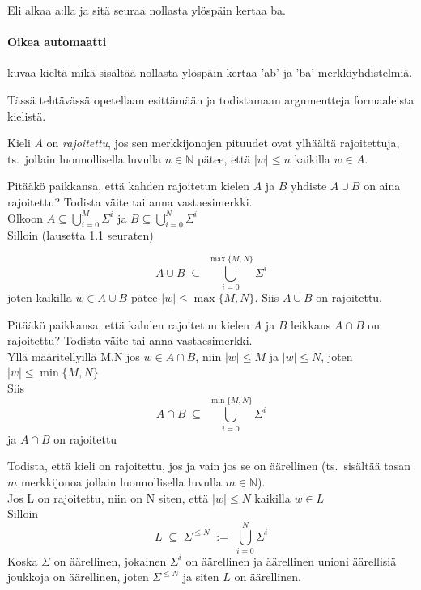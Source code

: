 \documentclass[12pt,a4paper]{article}
\newcommand{\abs}[1]{\lvert#1\rvert}
\newcommand{\N}{\mathbb{N}}
\begin{document}
Eli alkaa a:lla ja sitä seuraa nollasta ylöspäin kertaa ba.

\paragraph{Oikea automaatti} kuvaa kieltä mikä sisältää nollasta
ylöspäin kertaa 'ab' ja 'ba' merkkiyhdistelmiä.

\bigbreak



\pagebreak
{}
Tässä tehtävässä opetellaan esittämään ja todistamaan argumentteja formaaleista kielistä.

Kieli $A$ on {\em rajoitettu}, jos sen merkkijonojen pituudet ovat
ylhäältä rajoitettuja, ts.\ jollain luonnollisella luvulla
$n\in\N$ pätee, että $\abs{w}\leq n$ kaikilla $w\in A$.

\begin{kohta}
\item %
Pitääkö paikkansa, että kahden rajoitetun kielen $A$ ja $B$
yhdiste $A\cup B$ on aina rajoitettu? Todista väite tai anna vastaesimerkki.\\

Olkoon $A\subseteq \bigcup_{i=0}^{M}\Sigma^i$ ja $B\subseteq \bigcup_{i=0}^{N}\Sigma^i$\\

Silloin (lausetta 1.1 seuraten)

\[
A\cup B \;\subseteq\; \bigcup_{i=0}^{\max\{M,N\}} \Sigma^i
\]
joten kaikilla $w\in A\cup B$ pätee $|w|\le \max\{M,N\}$. Siis $A\cup B$ on rajoitettu.



\item %
Pitääkö paikkansa, että kahden rajoitetun kielen $A$ ja $B$ leikkaus $A\cap B$ on rajoitettu? Todista väite tai anna vastaesimerkki.\\

Yllä määritellyillä M,N jos $w\in A\cap B$, niin $|w|\le M$ ja $|w|\le N$, joten
$|w|\le \min\{M,N\}$\\

Siis
\[
A\cap B \;\subseteq\; \bigcup_{i=0}^{\min\{M,N\}} \Sigma^i
\]
ja $A\cap B$ on rajoitettu



\item %
Todista, että kieli on rajoitettu, jos ja vain jos se on
äärellinen (ts.\ sisältää tasan $m$ merkkijonoa jollain
luonnollisella luvulla $m\in\N$).\\

Jos L on rajoitettu, niin on N siten, että $|w|\le N$ kaikilla $w\in L$ \\

Silloin
\[
L \;\subseteq\; \Sigma^{\le N} \;:=\; \bigcup_{i=0}^{N}\Sigma^i
\]
Koska $\Sigma$ on äärellinen, jokainen $\Sigma^i$ on äärellinen ja äärellinen
unioni äärellisiä joukkoja on äärellinen, joten $\Sigma^{\le N}$ ja siten $L$ on äärellinen.

\end{kohta}
\end{document}
